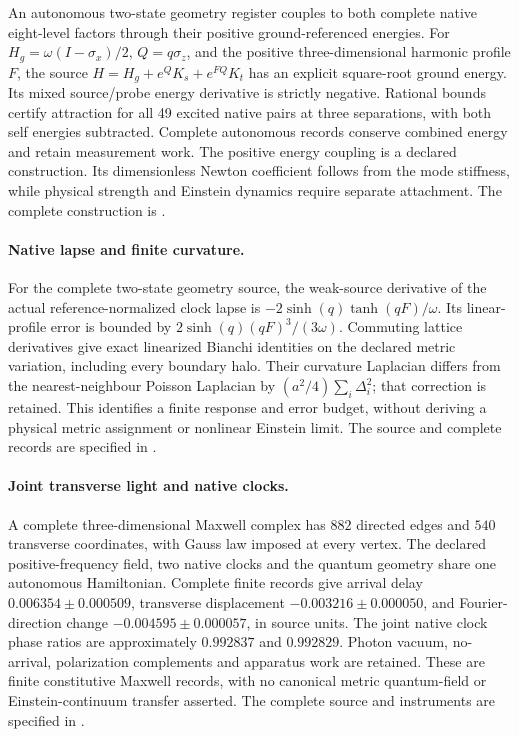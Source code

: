 An autonomous two-state geometry register couples to both complete native
eight-level factors through their positive ground-referenced energies.
For \(H_g=\omega(I-\sigma_x)/2\), \(Q=q\sigma_z\), and the positive
three-dimensional harmonic profile \(F\), the source
\(H=H_g+e^QK_s+e^{FQ}K_t\) has an explicit square-root ground energy.
Its mixed source/probe energy derivative is strictly negative.
Rational bounds certify attraction for all 49 excited native pairs at
three separations, with both self energies subtracted. Complete autonomous
records conserve combined energy and retain measurement work.
The positive energy coupling is a declared construction.
Its dimensionless Newton coefficient follows from the mode stiffness,
while physical strength and Einstein dynamics require separate attachment.
The complete construction is .

\paragraph{Native lapse and finite curvature.}
For the complete two-state geometry source, the weak-source derivative of
the actual reference-normalized clock lapse is
$-2\sinh(q)\tanh(qF)/\omega$.
Its linear-profile error is bounded by
$2\sinh(q)(qF)^3/(3\omega)$.
Commuting lattice derivatives give exact linearized Bianchi identities on
the declared metric variation, including every boundary halo. Their
curvature Laplacian differs from the nearest-neighbour Poisson Laplacian by
$(a^2/4)\sum_i\Delta_i^2$; that correction is retained. This identifies a
finite response and error budget, without deriving a physical metric assignment or nonlinear Einstein limit.
The source and complete records are specified in .

\paragraph{Joint transverse light and native clocks.}
A complete three-dimensional Maxwell complex has $882$ directed edges and
$540$ transverse coordinates, with Gauss law imposed at every vertex.
The declared positive-frequency field, two native clocks and the quantum
geometry share one autonomous Hamiltonian. Complete finite records give
arrival delay $0.006354\pm0.000509$, transverse displacement
$-0.003216\pm0.000050$, and Fourier-direction change
$-0.004595\pm0.000057$, in source units. The joint native clock phase ratios
are approximately $0.992837$ and $0.992829$. Photon vacuum, no-arrival,
polarization complements and apparatus work are retained. These are finite
constitutive Maxwell records, with no canonical metric quantum-field or
Einstein-continuum transfer asserted.
The complete source and instruments are specified in .

